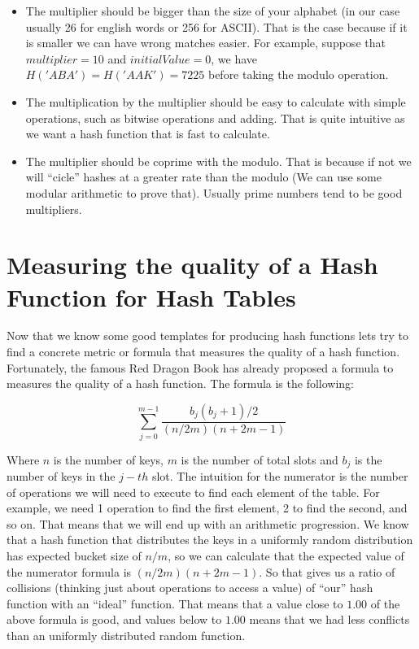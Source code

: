 \begin{itemize}
\item The multiplier should be bigger than the size of your alphabet (in our case usually 26 for english words or 256 for ASCII). That is the case because if it is smaller we can have wrong matches easier. For example, suppose that \( multiplier = 10 \) and \( initialValue = 0 \), we have \( H('ABA') = H('AAK') = 7225 \) before taking the modulo operation.

\item The multiplication by the multiplier should be easy to calculate with simple operations, such as bitwise operations and adding. That is quite intuitive as we want a hash function that is fast to calculate. 

\item The multiplier should be coprime with the modulo. That is because if not we will ``cicle'' hashes at a greater rate than the modulo (We can use some modular arithmetic to prove that). Usually prime numbers tend to be good multipliers.
\end{itemize}

\section{Measuring the quality of a Hash Function for Hash Tables}

Now that we know some good templates for producing hash functions lets try to find a concrete metric or formula that measures the quality of a hash function. Fortunately, the famous Red Dragon Book \cite{DragonBook} has already proposed a formula to measures the quality of a hash function. The formula is the following:

\[ \sum_{j = 0}^{m - 1} \frac{b_j(b_j + 1)/2}{ (n/2m)(n + 2m - 1) } \]

Where \( n \) is the number of keys, \( m \) is the number of total slots and \( b_j \) is the number of keys in the \( j-th \) slot. The intuition for the numerator is the number of operations we will need to execute to find each element of the table. For example, we need 1 operation to find the first element, 2 to find the second, and so on. That means that we will end up with an arithmetic progression. We know that a hash function that distributes the keys in a uniformly random distribution has expected bucket size of \( n / m \), so we can calculate that the expected value of the numerator formula is \( (n/2m)(n + 2m - 1) \). So that gives us a ratio of collisions (thinking just about operations to access a value) of ``our'' hash function with an ``ideal'' function. That means that a value close to \( 1.00 \) of the above formula is good, and values below to \( 1.00 \) means that we had less conflicts than an uniformly distributed random function.


